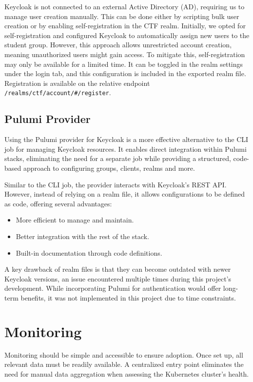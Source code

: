 Keycloak is not connected to an external Active Directory (AD), requiring us to manage user creation manually. This can be done either by scripting bulk user creation or by enabling self-registration in the CTF realm. Initially, we opted for self-registration and configured Keycloak to automatically assign new users to the student group. However, this approach allows unrestricted account creation, meaning unauthorized users might gain access. To mitigate this, self-registration may only be available for a limited time. It can be toggled in the realm settings under the login tab, and this configuration is included in the exported realm file. Registration is available on the relative endpoint \texttt{/realms/ctf/account/\#/register}. 

\subsection{Pulumi Provider}
Using the Pulumi provider for Keycloak \parencite{pulumiKeycloak} is a more effective alternative to the CLI job for managing Keycloak resources. It enables direct integration within Pulumi stacks, eliminating the need for a separate job while providing a structured, code-based approach to configuring groups, clients, realms and more.

Similar to the CLI job, the provider interacts with Keycloak's REST API. However, instead of relying on a realm file, it allows configurations to be defined as code, offering several advantages:

\begin{itemize}
    \item More efficient to manage and maintain.
    \item Better integration with the rest of the stack.
    \item Built-in documentation through code definitions.
\end{itemize}

A key drawback of realm files is that they can become outdated with newer Keycloak versions, an issue encountered multiple times during this project's development. While incorporating Pulumi for authentication would offer long-term benefits, it was not implemented in this project due to time constraints.

\section{Monitoring}
Monitoring should be simple and accessible to ensure adoption. Once set up, all relevant data must be readily available. A centralized entry point eliminates the need for manual data aggregation when assessing the Kubernetes cluster's health.

